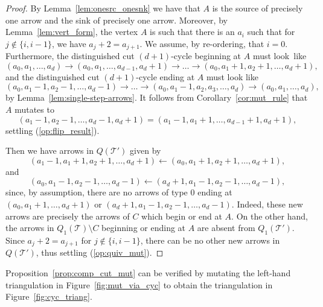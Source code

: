 \documentclass[ALCO,Unicode,published]{cedram}
\begin{document}
\begin{proof}
By Lemma~\ref{lem:onesrc_onesnk} we have that $A$ is the source of precisely one arrow and the sink of precisely one arrow. Moreover, by Lemma~\ref{lem:vert_form}, the vertex $A$ is such that there is an $a_{i}$ such that for $j \notin \{i, i - 1\}$, we have $a_{j} + 2 = a_{j + 1}$. We assume, by re-ordering, that $i = 0$. Furthermore, the distinguished cut $(d + 1)$-cycle beginning at $A$ must look~like \[(a_{0}, a_{1}, \dots , a_{d}) \rightarrow (a_{0}, a_{1}, \dots , a_{d - 1}, a_{d} + 1) \rightarrow \dots \rightarrow (a_{0}, a_{1} + 1, a_{2} + 1, \dots , a_{d} + 1),\] and the distinguished cut $(d + 1)$-cycle ending at $A$ must look like \[(a_{0}, a_{1} - 1, a_{2} - 1, \dots , a_{d} - 1) \rightarrow \dots \rightarrow (a_{0}, a_{1} - 1, a_{2}, a_{3}, \dots, a_{d}) \rightarrow (a_{0}, a_{1}, \dots , a_{d}),\] by Lemma~\ref{lem:single-step-arrows}. It follows from Corollary~\ref{cor:mut_rule} that $A$ mutates to \[(a_{1} - 1, a_{2} - 1, \dots, a_{d} - 1, a_{d} + 1) = (a_{1} - 1, a_{1} + 1, \dots, a_{d - 1} + 1, a_{d} + 1),\] settling (\ref{op:flip_result}).

Then we have arrows in $Q(\mathcal{T}')$ given by \[(a_{1} - 1, a_{1} + 1, a_{2} + 1, \dots, a_{d} + 1) \leftarrow (a_{0}, a_{1} + 1, a_{2} + 1, \dots , a_{d} + 1),\] and \[(a_{0}, a_{1} - 1, a_{2} - 1, \dots , a_{d} - 1) \leftarrow (a_{d} + 1, a_{1} - 1, a_{2} - 1, \dots, a_{d} - 1),\] since, by assumption, there are no arrows of type $0$ ending at $(a_{0}, a_{1} + 1, \dots , a_{d} + 1)$ or $(a_{d} + 1, a_{1} - 1, a_{2} - 1, \dots, a_{d} - 1)$. Indeed, these new arrows are precisely the arrows of $C$ which begin or end at $A$. On the other hand, the arrows in $Q_{1}(\mathcal{T})\setminus C$ beginning or ending at $A$ are absent from $Q_{1}(\mathcal{T}')$. Since $a_{j} + 2 = a_{j + 1}$ for $j \notin \{i, i - 1\}$, there can be no other new arrows in $Q(\mathcal{T}')$, thus settling (\ref{op:quiv_mut}).  
\end{proof}

\begin{exam}
Proposition~\ref{prop:comp_cut_mut} can be verified by mutating the left-hand triangulation in Figure~\ref{fig:mut_via_cyc} to obtain the triangulation in Figure~\ref{fig:cyc_triang}.
\end{exam}


 




\end{document}
